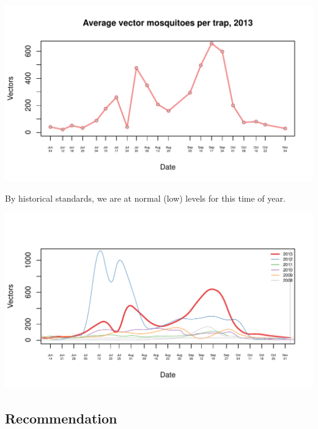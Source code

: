 \documentclass{article}
\begin{document}
\begin{center}
\includegraphics{mosq04nov13-003}
\end{center}
By historical standards, we are at normal (low) levels for this time of year.
\begin{center}
\includegraphics{mosq04nov13-004}
\end{center}
\subsection*{Recommendation}
\end{document}
